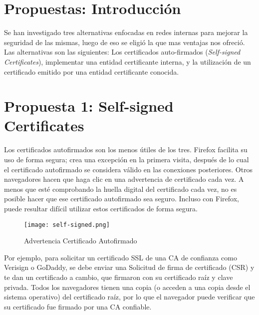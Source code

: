 
\section{Propuestas: Introducción}

Se han investigado tres alternativas enfocadas en redes internas para mejorar la seguridad de las 
mismas, luego de eso se eligió la que mas ventajas nos ofreció.
Las alternativas son las siguientes: Los certificados auto-firmados (\emph{Self-signed Certificates}), implementar
una entidad certificante interna, y la utilización de un certificado emitido por una entidad
certificante conocida.

\section{Propuesta 1: Self-signed Certificates}
Los certificados autofirmados son los menos útiles de los tres. Firefox facilita su uso 
de forma segura; crea una excepción en la primera visita, después de lo cual el 
certificado autofirmado se considera válido en las conexiones posteriores. Otros 
navegadores hacen que haga clic en una advertencia de certificado cada vez. A menos 
que esté comprobando la huella digital del certificado cada vez, no es posible hacer 
que ese certificado autofirmado sea seguro. Incluso con Firefox, puede resultar 
difícil utilizar estos certificados de forma segura.

\begin{center}
   \begin{figure}   
      \begin{center}
         \texttt{[image: self-signed.png]}
      \end{center}
      \caption{Advertencia Certificado Autofirmado}
   \end{figure}
\end{center}

Por ejemplo, para solicitar un certificado SSL de una CA de confianza como Verisign o 
GoDaddy, se debe enviar una Solicitud de firma de certificado (CSR) y te dan un 
certificado a cambio, que firmaron con su certificado raíz y clave privada. Todos 
los navegadores tienen una copia (o acceden a una copia desde el sistema operativo) 
del certificado raíz, por lo que el navegador puede verificar que su certificado 
fue firmado por una CA confiable.

